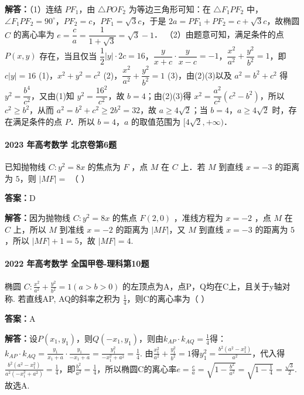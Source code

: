 \documentclass[UTF8,a4paper,11pt]{ctexart}
\begin{document}
\textbf{解答：}（1）连结 $PF_1$，由 $\triangle POF_2$ 为等边三角形可知：在 $\triangle F_1PF_2$ 中，$\angle F_1PF_2=90^\circ$，$PF_2=c$，$PF_1=\sqrt{3}c$，于是 $2a=PF_1+PF_2=c+\sqrt{3}c$，故椭圆 $C$ 的离心率为 $e=\dfrac{c}{a}=\dfrac{1}{1+\sqrt{3}}=\sqrt{3}-1$．
（2）由题意可知，满足条件的点 $P(x,y)$ 存在，当且仅当 $\dfrac{1}{2}|y|\cdot2c=16$，$\dfrac{y}{x+c}\cdot\dfrac{y}{x-c}=-1$，$\dfrac{x^2}{a^2}+\dfrac{y^2}{b^2}=1$，即 $c|y|=16$ (1)，$x^2+y^2=c^2$ (2)，$\dfrac{x^2}{a^2}+\dfrac{y^2}{b^2}=1$ (3)，由(2)(3)以及 $a^2=b^2+c^2$ 得 $y^2=\dfrac{b^4}{c^2}$，又由(1)知 $y^2=\dfrac{16^2}{c^2}$，故 $b=4$；由(2)(3)得 $x^2=\dfrac{a^2}{c^2}(c^2-b^2)$，所以 $c^2\ge b^2$，从而 $a^2=b^2+c^2\ge 2b^2=32$，故 $a\ge 4\sqrt{2}$；当 $b=4$，$a\ge 4\sqrt{2}$ 时，存在满足条件的点 $P$．所以 $b=4$，$a$ 的取值范围为 $[4\sqrt{2},+\infty)$．

\paragraph{2023 年高考数学 北京卷第6题}

已知抛物线 $C: y^2 = 8x$ 的焦点为 $F$ ，点 $M$ 在 $C$ 上．若 $M$ 到直线 $x = -3$ 的距离为 $5$，则 $|MF| =$ （ ）

\textbf{答案：}D\par

\textbf{解答：}因为抛物线 $C: y^2 = 8x$ 的焦点 $F(2,0)$ ，准线方程为 $x = -2$ ，点 $M$ 在 $C$ 上，所以 $M$ 到准线 $x = -2$ 的距离为 $|MF|$，又 $M$ 到直线 $x = -3$ 的距离为 $5$，所以 $|MF| + 1 = 5$，故 $|MF| = 4$.

\paragraph{2022 年高考数学 全国甲卷-理科第10题}

椭圆 $C:\frac{x^2}{a^2}+\frac{y^2}{b^2}=1(a>b>0)$ 的左顶点为A，点P，Q均在C上，且关于y轴对称. 若直线AP, AQ的斜率之积为 $\frac{1}{4}$，则C的离心率为（ ）

\textbf{答案：}A\par

\textbf{解答：}设$P(x_1,y_1)$，则$Q(-x_1,y_1)$，则由$k_{AP}\cdot k_{AQ}=\frac{1}{4}$得：$k_{AP}\cdot k_{AQ}=\frac{y_1}{x_1+a}\cdot\frac{y_1}{-x_1+a}=\frac{y_1^2}{-x_1^2+a^2}=\frac{1}{4}$. 由$\frac{x_1^2}{a^2}+\frac{y_1^2}{b^2}=1$得$y_1^2=\frac{b^2(a^2-x_1^2)}{a^2}$，代入得$\frac{b^2(a^2-x_1^2)}{a^2(-x_1^2+a^2)}=\frac{1}{4}$，即$\frac{b^2}{a^2}=\frac{1}{4}$，所以椭圆C的离心率$e=\frac{c}{a}=\sqrt{1-\frac{b^2}{a^2}}=\sqrt{1-\frac{1}{4}}=\frac{\sqrt{3}}{2}$. 故选A.
\end{document}
